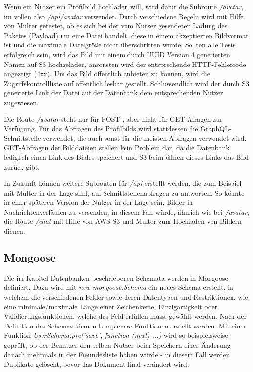 Wenn ein Nutzer ein Profilbild hochladen will, wird dafür die Subroute \textit{/avatar}, im vollen also \textit{/api/avatar} verwendet. Durch verschiedene Regeln wird mit Hilfe von Multer getestet, ob es sich bei der vom Nutzer gesendeten Ladung des Paketes (Payload) um eine Datei handelt, diese in einem akzeptierten Bildvormat ist und die maximale Dateigröße nicht überschritten wurde. Sollten alle Tests erfolgreich sein, wird das Bild mit einem durch UUID Version 4 generierten Namen auf S3 hochgeladen, ansonsten wird der entsprechende HTTP-Fehlercode angezeigt (4xx). Um das Bild öffentlich anbieten zu können, wird die Zugriffskontrollliste auf öffentlich lesbar gestellt. Schlussendlich wird der durch S3 generierte Link der Datei auf der Datenbank dem entsprechenden Nutzer zugewiesen.

Die Route \textit{/avatar} steht nur für POST-, aber nicht für GET-Afragen zur Verfügung. Für das Abfragen des Profilbilds wird stattdessen die GraphQL-Schnittstelle verwendet, die auch sonst für die meisten Abfragen verwendet wird. GET-Abfragen der Bilddateien stellen kein Problem dar, da die Datenbank lediglich einen Link des Bildes speichert und S3 beim öffnen dieses Links das Bild zurück gibt.

In Zukunft können weitere Subrouten für \textit{/api} erstellt werden, die zum Beispiel mit Multer in der Lage sind, auf Schnittstellenabfragen zu antworten. So könnte in einer späteren Version der Nutzer in der Lage sein, Bilder in Nachrichtenverläufen zu versenden, in diesem Fall würde, ähnlich wie bei \textit{/avatar}, die Route \textit{/chat} mit Hilfe von AWS S3 und Multer zum Hochladen von Bildern dienen.

\subsection{Mongoose}
Die im Kapitel Datenbanken beschriebenen Schemata werden in Mongoose definiert. Dazu wird mit \textit{new mongoose.Schema} ein neues Schema erstellt, in welchem die verschiedenen Felder sowie deren Datentypen und Restriktionen, wie eine minimale/maximale Länge einer Zeichenkette, Einzigartigkeit oder Validierungsfunktionen, welche das Feld erfüllen muss, gewählt werden. Nach der Definition des Schemas können komplexere Funktionen erstellt werden. Mit einer Funktion \textit{UserSchema.pre('save', function (next) {...})} wird so beispielsweise geprüft, ob der Benutzer den selben Nutzer beim Speichern einer Änderung danach mehrmals in der Freundesliste haben würde - in diesem Fall werden Duplikate gelöscht, bevor das Dokument final verändert wird.

